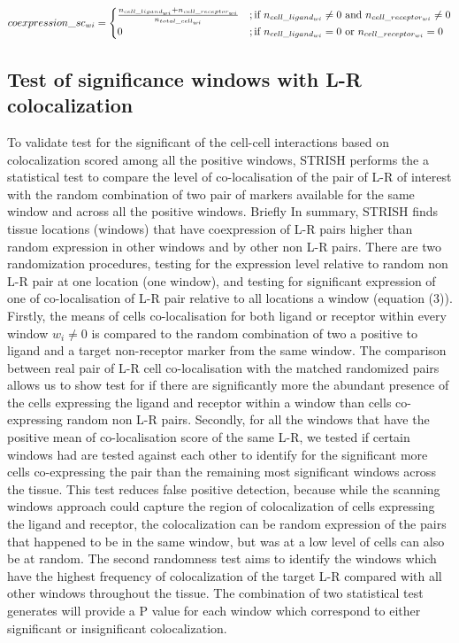 \begin{equation}
    coexpression\_sc_{wi} = \begin{cases}
    \frac{n_{cell\_ligand_{wi}} + n_{cell\_receptor_{wi}} }{n_{total\_cell_{wi}}}&;\text{if $ n_{cell\_ligand_{wi}} \neq 0$ and $n_{cell\_receptor_{wi}} \neq 0$}\\
    0              & ;\text{if $ n_{cell\_ligand_{wi}} = 0$ or $n_{cell\_receptor_{wi}} = 0$}
\end{cases}
\end{equation}

\subsection{Test of significance windows with L-R colocalization}
To validate test for the significant of the cell-cell interactions based on colocalization scored among all the positive windows, STRISH performs the a statistical test to compare the level of co-localisation of the pair of L-R of interest with the random combination of two pair of markers available for the same window and across all the positive windows. Briefly In summary, STRISH finds tissue locations (windows) that have coexpression of L-R pairs higher than random expression in other windows and by other non L-R pairs.  There are two randomization procedures, testing for the expression level relative to random non L-R pair at one location (one window), and testing for significant expression of one of co-localisation of L-R pair relative to all locations a window (equation (3)). Firstly, the means of cells co-localisation for both ligand or receptor within every window $w_i \neq 0$ is compared to the random combination of two a positive to ligand and a target non-receptor marker from the same window. The comparison between real pair of L-R cell co-localisation with the matched randomized pairs allows us to show test for if there are significantly more the abundant presence of the cells expressing  the ligand and receptor within a window than cells co-expressing random non L-R pairs. Secondly, for all the windows that have the positive mean of co-localisation score of the same L-R, we tested if certain windows had  are tested against each other to identify for the significant more cells co-expressing the pair than the remaining  most significant windows across the tissue. This test reduces false positive detection, because while the scanning windows approach could capture the region of colocalization of cells expressing the ligand and receptor, the colocalization can be random expression of the pairs that happened to be in the same window, but was at a low level of cells can also be at random. The second randomness test aims to identify the windows which have the highest frequency of colocalization of the target L-R compared with all other windows throughout the tissue. The combination of two statistical test generates will provide a P value for each window which correspond to either significant or insignificant colocalization.

